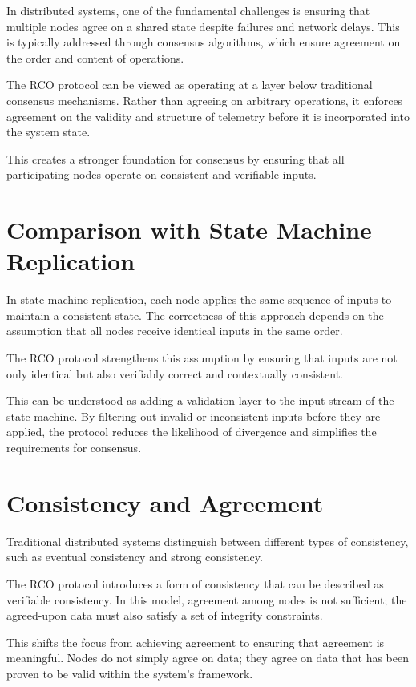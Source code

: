 In distributed systems, one of the fundamental challenges is ensuring that multiple nodes agree on a shared state despite failures and network delays. This is typically addressed through consensus algorithms, which ensure agreement on the order and content of operations.

The RCO protocol can be viewed as operating at a layer below traditional consensus mechanisms. Rather than agreeing on arbitrary operations, it enforces agreement on the validity and structure of telemetry before it is incorporated into the system state.

This creates a stronger foundation for consensus by ensuring that all participating nodes operate on consistent and verifiable inputs.

\section{Comparison with State Machine Replication}

In state machine replication, each node applies the same sequence of inputs to maintain a consistent state. The correctness of this approach depends on the assumption that all nodes receive identical inputs in the same order.

The RCO protocol strengthens this assumption by ensuring that inputs are not only identical but also verifiably correct and contextually consistent.

This can be understood as adding a validation layer to the input stream of the state machine. By filtering out invalid or inconsistent inputs before they are applied, the protocol reduces the likelihood of divergence and simplifies the requirements for consensus.

\section{Consistency and Agreement}

Traditional distributed systems distinguish between different types of consistency, such as eventual consistency and strong consistency.

The RCO protocol introduces a form of consistency that can be described as verifiable consistency. In this model, agreement among nodes is not sufficient; the agreed-upon data must also satisfy a set of integrity constraints.

This shifts the focus from achieving agreement to ensuring that agreement is meaningful. Nodes do not simply agree on data; they agree on data that has been proven to be valid within the system’s framework.

